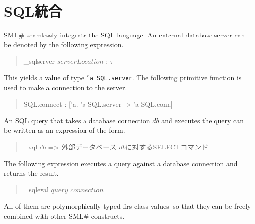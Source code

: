 \documentclass{jbook}
\newif\ifjp
\newcommand{\txt}[2]{#1}
\newcommand{\smlsharp}{SML\#}
\newenvironment{program}{\begin{quote}\begin{tt}}%
                        {\end{tt}\end{quote}}
\begin{document}
\section{\txt{SQL統合}{Seamless SQL integration}}
\ifjp%
	\smlsharp{}はシームレスにSQLを統合している．
	外部データベースを以下の式によって宣言できる．
\begin{program}
\_sqlserver $serverLocation$ : $\tau$
\end{program}
	この結果は，外部データベースを表す{\tt 'a SQL.server}型の値である．
	以下の関数によって，このデータベースに接続できる．
\begin{program}
SQL.connect : ['a. 'a SQL.server -> 'a SQL.conn]
\end{program}
	外部データベース接続を受け取り検索するSQL問い合わせ文，
\smlsharp{}の多相的な型を持つ式として記述することができる．
\begin{program}
\_sql $db$ => 外部データベース $db$に対するSELECTコマンド
\end{program}
	SQL問い合わせ文を以下の構文でデータベース接続に適用すると，
問い合わせの結果が得られる．
\begin{program}
\_sqleval $query$ $connection$
\end{program}
	これらはすべて型を持つ，従ってfirst-classの値であり，\smlsharp{}
の他の要素と自由に組み合わせて使用することができる．
\else%
	\smlsharp{} seamlessly integrate the SQL language.
	An external database server can be denoted by the following
expression.

\begin{program}
\_sqlserver $serverLocation$ : $\tau$
\end{program}
	This yields a value of type {\tt 'a SQL.server}.
	The following primitive function is used to make a connection to
the server.
\begin{program}
SQL.connect : ['a. 'a SQL.server -> 'a SQL.conn]
\end{program}
	An SQL query that takes a database connection $db$ and executes
the query can be written as an expression of the form.
\begin{program}
\_sql $db$ => 外部データベース $db$に対するSELECTコマンド
\end{program}
	The following expression executes a query against a database
connection and returns the result.
\begin{program}
\_sqleval $query$ $connection$
\end{program}
	All of them are polymorphically typed firs-class values, so
that they can be freely combined with other \smlsharp{} constructs.
\fi%
\end{document}
